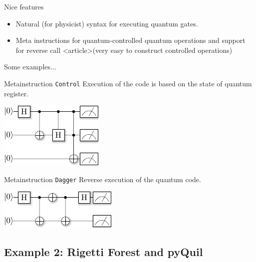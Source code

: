 \documentclass[a4paper,11pt]{article}
\begin{document}

Nice features
\begin{itemize}
\item Natural (for physicist) syntax for executing quantum gates.
\item Meta instructions for quantum-controlled quantum operations and 
support for reverse call
<article>{(very easy to construct controlled operations)}
\end{itemize}



Some examples...



{Metainstruction \texttt{Control}}
Execution of the code is based on the state of quantum register.


\begin{center}
\includegraphics[scale=1.5]{../slides/pics/meta_control_circ.pdf}
\end{center}



{Metainstruction \texttt{Dagger}}
Reverse execution of the quantum code.


\begin{center}
\includegraphics[scale=1.5]{../slides/pics/meta_dagger_circ.pdf}
\end{center}


\subsection{Example 2: Rigetti Forest and pyQuil}
\end{document}

